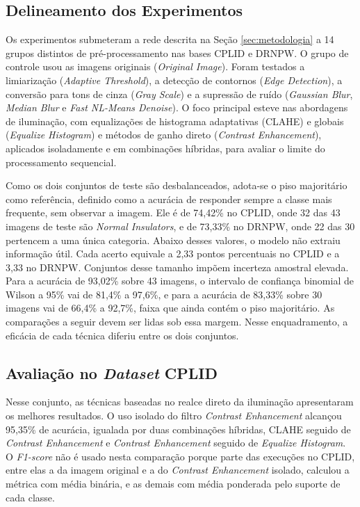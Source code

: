 \documentclass[conference]{IEEEtran}
\begin{document}
\subsection{Delineamento dos Experimentos}

Os experimentos submeteram a rede descrita na Seção \ref{sec:metodologia} a 14 grupos distintos de pré-processamento nas bases CPLID e DRNPW. O grupo de controle usou as imagens originais (\textit{Original Image}). Foram testados a limiarização (\textit{Adaptive Threshold}), a detecção de contornos (\textit{Edge Detection}), a conversão para tons de cinza (\textit{Gray Scale}) e a supressão de ruído (\textit{Gaussian Blur}, \textit{Median Blur} e \textit{Fast NL-Means Denoise}). O foco principal esteve nas abordagens de iluminação, com equalizações de histograma adaptativas (CLAHE) e globais (\textit{Equalize Histogram}) e métodos de ganho direto (\textit{Contrast Enhancement}), aplicados isoladamente e em combinações híbridas, para avaliar o limite do processamento sequencial.

Como os dois conjuntos de teste são desbalanceados, adota-se o piso majoritário como referência, definido como a acurácia de responder sempre a classe mais frequente, sem observar a imagem. Ele é de 74,42\% no CPLID, onde 32 das 43 imagens de teste são \textit{Normal Insulators}, e de 73,33\% no DRNPW, onde 22 das 30 pertencem a uma única categoria. Abaixo desses valores, o modelo não extraiu informação útil. Cada acerto equivale a 2,33 pontos percentuais no CPLID e a 3,33 no DRNPW. Conjuntos desse tamanho impõem incerteza amostral elevada. Para a acurácia de 93,02\% sobre 43 imagens, o intervalo de confiança binomial de Wilson a 95\% vai de 81,4\% a 97,6\%, e para a acurácia de 83,33\% sobre 30 imagens vai de 66,4\% a 92,7\%, faixa que ainda contém o piso majoritário. As comparações a seguir devem ser lidas sob essa margem. Nesse enquadramento, a eficácia de cada técnica diferiu entre os dois conjuntos.

\subsection{Avaliação no \textit{Dataset} CPLID}

Nesse conjunto, as técnicas baseadas no realce direto da iluminação apresentaram os melhores resultados. O uso isolado do filtro \textit{Contrast Enhancement} alcançou 95,35\% de acurácia, igualada por duas combinações híbridas, CLAHE seguido de \textit{Contrast Enhancement} e \textit{Contrast Enhancement} seguido de \textit{Equalize Histogram}. O \textit{F1-score} não é usado nesta comparação porque parte das execuções no CPLID, entre elas a da imagem original e a do \textit{Contrast Enhancement} isolado, calculou a métrica com média binária, e as demais com média ponderada pelo suporte de cada classe.
\end{document}

